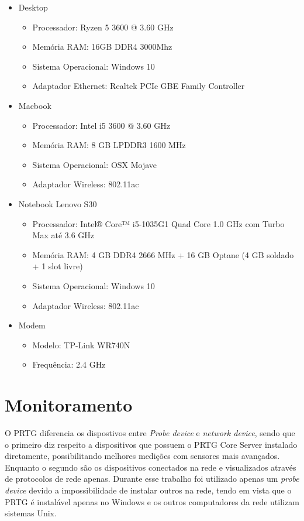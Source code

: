 \documentclass[12pt]{article}
\begin{document}
\begin{itemize}
    \item Desktop
    \begin{itemize}
        \item Processador: Ryzen 5 3600 @ 3.60 GHz
        \item Memória RAM: 16GB DDR4 3000Mhz
        \item Sistema Operacional: Windows 10
        \item Adaptador Ethernet: Realtek PCIe GBE Family Controller
    \end{itemize}
    \item Macbook
    \begin{itemize}
        \item Processador: Intel i5 3600 @ 3.60 GHz
        \item Memória RAM: 8 GB LPDDR3 1600 MHz
        \item Sistema Operacional: OSX Mojave
        \item Adaptador Wireless: 802.11ac
    \end{itemize}
    \item Notebook Lenovo S30
    \begin{itemize}
        \item Processador: Intel® Core™ i5-1035G1 Quad Core 1.0 GHz com Turbo Max até 3.6 GHz
        \item Memória RAM: 4 GB DDR4 2666 MHz + 16 GB Optane (4 GB soldado + 1 slot livre)
        \item Sistema Operacional: Windows 10
        \item Adaptador Wireless: 802.11ac
    \end{itemize}
    \item Modem
    \begin{itemize}
        \item Modelo: TP-Link WR740N
        \item Frequência: 2.4 GHz
    \end{itemize}
\end{itemize}

\section{Monitoramento}

O PRTG diferencia os dispostivos entre \emph{Probe device} e \emph{network device}, sendo que o primeiro diz respeito a dispositivos que possuem o PRTG Core Server instalado diretamente, possibilitando melhores medições com sensores mais avançados. Enquanto o segundo são os dispositivos conectados na rede e visualizados através de protocolos de rede apenas. Durante esse trabalho foi utilizado apenas um \emph{probe device} devido a impossibilidade de instalar outros na rede, tendo em vista que o PRTG é instalável apenas no Windows e os outros computadores da rede utilizam sistemas Unix.
\end{document}
